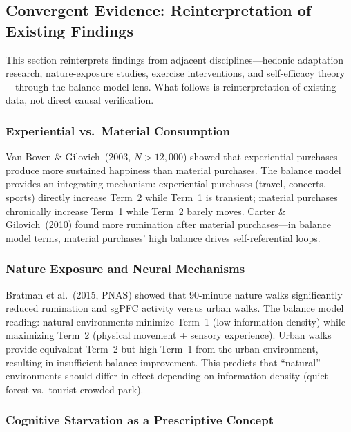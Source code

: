 \documentclass[a4paper,11pt,titlepage]{article}
\begin{document}
\subsection{Convergent Evidence: Reinterpretation of Existing Findings}\label{sec:convergent}

This section reinterprets findings from adjacent disciplines---hedonic adaptation research, nature-exposure studies, exercise interventions, and self-efficacy theory---through the balance model lens. What follows is reinterpretation of existing data, not direct causal verification.

\subsubsection{Experiential vs.\ Material Consumption}

Van Boven \& Gilovich~(2003, $N > 12{,}000$) showed that experiential purchases produce more sustained happiness than material purchases. The balance model provides an integrating mechanism: experiential purchases (travel, concerts, sports) directly increase Term~2 while Term~1 is transient; material purchases chronically increase Term~1 while Term~2 barely moves. Carter \& Gilovich~(2010) found more rumination after material purchases---in balance model terms, material purchases' high balance drives self-referential loops.

\subsubsection{Nature Exposure and Neural Mechanisms}

Bratman et al.~(2015, PNAS) showed that 90-minute nature walks significantly reduced rumination and sgPFC activity versus urban walks. The balance model reading: natural environments minimize Term~1 (low information density) while maximizing Term~2 (physical movement + sensory experience). Urban walks provide equivalent Term~2 but high Term~1 from the urban environment, resulting in insufficient balance improvement. This predicts that ``natural'' environments should differ in effect depending on information density (quiet forest vs.\ tourist-crowded park).

\subsubsection{Cognitive Starvation as a Prescriptive Concept}
\end{document}
